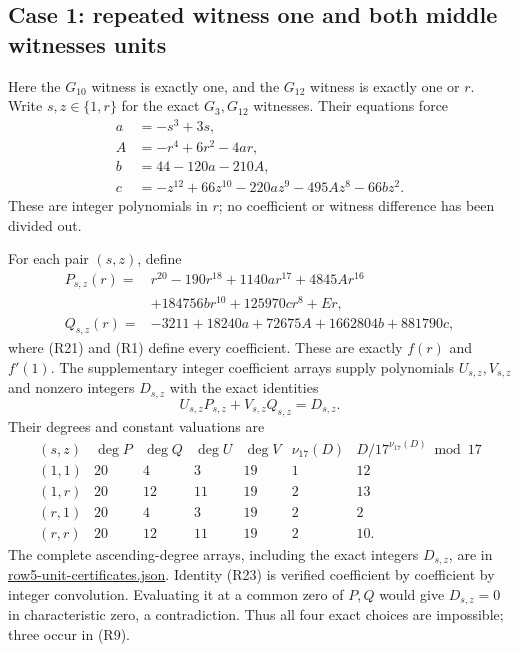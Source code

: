 \documentclass[
  british,
  10pt,
  a4paper,
]{article}
\begin{document}
\subsection{Case 1: repeated witness one and both middle witnesses
units}\label{case-1-repeated-witness-one-and-both-middle-witnesses-units}

Here the \(G_{10}\) witness is exactly one, and the \(G_{12}\) witness
is exactly one or \(r\). Write \(s,z\in\{1,r\}\) for the exact
\(G_3,G_{12}\) witnesses. Their equations force \[
\begin{aligned}
a&=-s^3+3s,\\
A&=-r^4+6r^2-4ar,\\
b&=44-120a-210A,\\
c&=-z^{12}+66z^{10}-220az^9-495Az^8-66bz^2.
\end{aligned}                                                \tag{R21}
\] These are integer polynomials in \(r\); no coefficient or witness
difference has been divided out.

For each pair \((s,z)\), define \[
\begin{aligned}
P_{s,z}(r)={}&r^{20}-190r^{18}+1140ar^{17}+4845Ar^{16}\\
&+184756br^{10}+125970cr^8+Er,\\
Q_{s,z}(r)={}&-3211+18240a+72675A+1662804b+881790c,
\end{aligned}                                                \tag{R22}
\] where (R21) and (R1) define every coefficient. These are exactly
\(f(r)\) and \(f'(1)\). The supplementary integer coefficient arrays
supply polynomials \(U_{s,z},V_{s,z}\) and nonzero integers \(D_{s,z}\)
with the exact identities \[
U_{s,z}P_{s,z}+V_{s,z}Q_{s,z}=D_{s,z}.                        \tag{R23}
\] Their degrees and constant valuations are \[
\begin{array}{c|rrrr|rr}
(s,z)&\deg P&\deg Q&\deg U&\deg V&
\nu_{17}(D)&D/17^{\nu_{17}(D)}\bmod17\\ \hline
(1,1)&20&4&3&19&1&12\\
(1,r)&20&12&11&19&2&13\\
(r,1)&20&4&3&19&2&2\\
(r,r)&20&12&11&19&2&10.
\end{array}                                                  \tag{R24}
\] The complete ascending-degree arrays, including the exact integers
\(D_{s,z}\), are in
\href{research/next-stage/row5-unit/row5-unit-certificates.json}{row5-unit-certificates.json}.
Identity (R23) is verified coefficient by coefficient by integer
convolution. Evaluating it at a common zero of \(P,Q\) would give
\(D_{s,z}=0\) in characteristic zero, a contradiction. Thus all four
exact choices are impossible; three occur in (R9).
\end{document}

